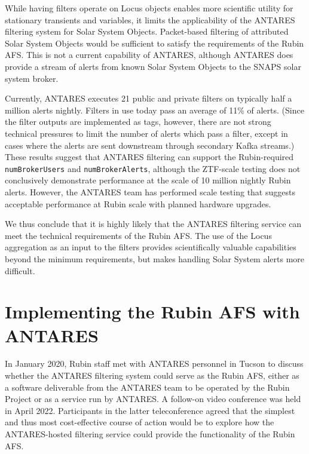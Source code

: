\documentclass[DM,authoryear,toc]{lsstdoc}
\begin{document}
While having filters operate on Locus objects enables more scientific utility for stationary transients and variables, it limits the applicability of the ANTARES filtering system for Solar System Objects.
Packet-based filtering of attributed Solar System Objects would be sufficient to satisfy the requirements of the Rubin AFS.
This is not a current capability of ANTARES, although ANTARES does provide a stream of alerts from known Solar System Objects to the SNAPS solar system broker.

Currently, ANTARES executes 21 public and private filters on typically half a million alerts nightly.
Filters in use today pass an average of 11\% of alerts.
(Since the filter outputs are implemented as tags, however, there are not strong technical pressures to limit the number of alerts which pass a filter, except in cases where the alerts are sent downstream through secondary Kafka streams.)
These results suggest that ANTARES filtering can support the Rubin-required \texttt{numBrokerUsers} and \texttt{numBrokerAlerts}, although the ZTF-scale testing does not conclusively demonstrate performance at the scale of 10 million nightly Rubin alerts.
However, the ANTARES team has performed scale testing that suggests acceptable performance at Rubin scale with planned hardware upgrades.

We thus conclude that it is highly likely that the ANTARES filtering service can meet the technical requirements of the Rubin AFS.
The use of the Locus aggregation as an input to the filters provides scientifically valuable capabilities beyond the minimum requirements, but makes handling Solar System alerts more difficult.



\section{Implementing the Rubin AFS with ANTARES} \label{sec:implementation}

In January 2020, Rubin staff 
met with ANTARES personnel %
in Tucson to discuss whether the ANTARES filtering system could serve as the Rubin AFS, either as a software deliverable from the ANTARES team to be operated by the Rubin Project or as a service run by ANTARES.
A follow-on video conference was held in April 2022.
Participants in the latter teleconference agreed that the simplest and thus most cost-effective course of action would be to explore how the ANTARES-hosted filtering service could provide the functionality of the Rubin AFS.
\end{document}
